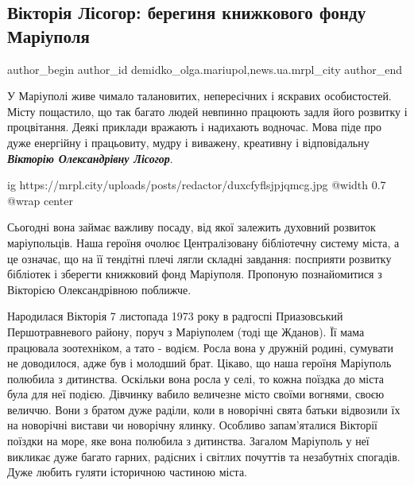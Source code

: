  
 
 
 
 
 
\subsection{Вікторія Лісогор: берегиня книжкового фонду Маріуполя}
\label{sec:19_02_2019.stz.news.ua.mrpl_city.1.viktoria_lisogor_beregynja_fondu_mariupolja}
 
\ifcmt
 author_begin
   author_id demidko_olga.mariupol,news.ua.mrpl_city
 author_end
\fi

У Маріуполі живе чимало талановитих, непересічних і яскравих особистостей.
Місту пощастило, що так багато людей невпинно працюють задля його розвитку і
процвітання. Деякі приклади вражають і надихають водночас. Мова піде про дуже
енергійну і працьовиту, мудру і виважену, креативну і відповідальну
\emph{\textbf{Вікторію Олександрівну Лісогор}}. 

\ifcmt
  ig https://mrpl.city/uploads/posts/redactor/duxcfyflsjpjqmcg.jpg
  @width 0.7
	@wrap center
\fi

Сьогодні вона займає важливу
посаду, від якої залежить духовний розвиток маріупольців. Наша героїня очолює
Централізовану бібліотечну систему міста, а це означає, що на її тендітні плечі
лягли складні завдання: посприяти розвитку бібліотек і зберегти книжковий фонд
Маріуполя. Пропоную познайомитися з Вікторією Олександрівною поближче.


Народилася Вікторія 7 листопада 1973 року в радгоспі Приазовський
Першотравневого району, поруч з Маріуполем (тоді ще Жданов). Її мама працювала
зоотехніком, а тато - водієм. Росла вона у дружній родині, сумувати не
доводилося, адже був і молодший брат. Цікаво, що наша героїня Маріуполь
полюбила з дитинства. Оскільки вона росла у селі, то кожна поїздка до міста
була для неї подією. Дівчинку вабило величезне місто своїми вогнями, своєю
величчю. Вони з братом дуже раділи, коли в новорічні свята батьки відвозили їх
на новорічні вистави чи новорічну ялинку. Особливо запам'яталися Вікторії
поїздки на море, яке вона полюбила з дитинства. Загалом Маріуполь у неї
викликає дуже багато гарних, радісних і світлих почуттів та незабутніх
спогадів. Дуже любить гуляти історичною частиною міста.

